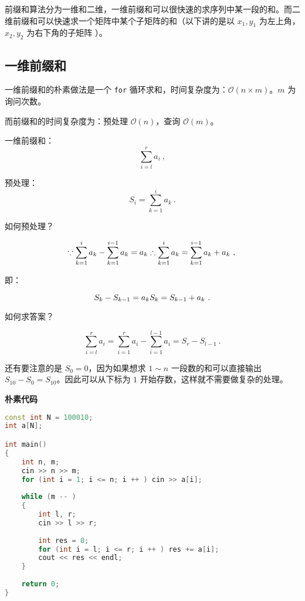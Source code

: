 
前缀和算法分为一维和二维，一维前缀和可以很快速的求序列中某一段的和。而二维前缀和可以快速求一个矩阵中某个子矩阵的和（以下讲的是以 $x_1, y_1$ 为左上角，$x_2, y_2$ 为右下角的子矩阵 ）。

\subsection{一维前缀和}
一维前缀和的朴素做法是一个 \verb|for| 循环求和，时间复杂度为：$\mathcal{O}(n \times m)$。$m$ 为询问次数。

而前缀和的时间复杂度为：预处理 $\mathcal{O}(n)$，查询 $\mathcal{O}(m)$。

一维前缀和：
\begin{equation}
\sum^{r}_{i=l}a_i~,
\end{equation}

预处理：
\begin{equation}
S_i=\sum^{i}_{k=1}a_k~.
\end{equation}

如何预处理？

\begin{equation}
\because 
\sum^{i}_{k=1}a_k-\sum^{i-1}_{k=1}a_{k}=a_k \\
 \therefore \sum^{i}_{k=1}a_k=\sum^{i-1}_{k=1}a_{k}+a_k ~,\\
\end{equation}

即：

\begin{equation}
\\S_k-S_{k-1}=a_k\\
 \\S_k=S_{k-1}+a_k~.\\
\end{equation}

如何求答案？

\begin{equation}
\sum^{r}_{i=l}a_i=\sum^{r}_{i=1}a_i-\sum^{l-1}_{i=1}a_i=S_r-S_{l-1}~.
\end{equation}

还有要注意的是 $S_0 = 0$，因为如果想求 $1 \sim n$ 一段数的和可以直接输出 $S_{10} - S_0 = S_{10} $。因此可以从下标为 $1$ 开始存数，这样就不需要做复杂的处理。

\textbf{朴素代码}
\begin{lstlisting}[language=cpp]
const int N = 100010;
int a[N];

int main()
{
    int n, m;
    cin >> n >> m;
    for (int i = 1; i <= n; i ++ ) cin >> a[i];
    
    while (m -- )
    {
        int l, r;
        cin >> l >> r;
        
        int res = 0;
        for (int i = l; i <= r; i ++ ) res += a[i];
        cout << res << endl;
    }
    
    return 0;
}
\end{lstlisting}

